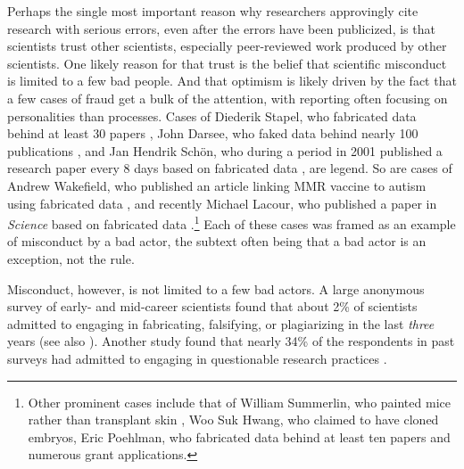 \documentclass[12pt, letterpaper]{article}
\begin{document}
Perhaps the single most important reason why researchers approvingly cite research with serious errors, even after the errors have been publicized, is that scientists trust other scientists, especially peer-reviewed work produced by other scientists. One likely reason for that trust is the belief that scientific misconduct is limited to a few bad people. And that optimism is likely driven by the fact that a few cases of fraud get a bulk of the attention, with reporting often focusing on personalities than processes. Cases of Diederik Stapel, who fabricated data behind at least 30 papers \citep{levelt2012flawed}, John Darsee, who faked data behind nearly 100 publications \citep{stewart1987integrity, anderson2013research, wallis1983fraud}, and Jan Hendrik Sch{\"o}n, who during a period in 2001 published a research paper every 8 days based on fabricated data \citep{service2003scientific, anderson2013research}, are legend. So are cases of Andrew Wakefield, who published an article linking MMR vaccine to autism using fabricated data \citep{wakefield1998retracted, deer2011case, godlee2011wakefield}, and recently Michael Lacour, who published a paper in \textit{Science} based on fabricated data \citep{broockman2015irregularities, mcnutt2015editorial}.\footnote{Other prominent cases include that of William Summerlin, who painted mice rather than transplant skin \citep{basu2006they, anderson2013research}, Woo Suk Hwang, who claimed to have cloned embryos, Eric Poehlman, who fabricated data behind at least ten papers and numerous grant applications.} Each of these cases was framed as an example of misconduct by a bad actor, the subtext often being that a bad actor is an exception, not the rule. 

Misconduct, however, is not limited to a few bad actors.  A large anonymous survey of early- and mid-career scientists found that about 2\% of scientists admitted to engaging in fabricating, falsifying, or plagiarizing in the last \textit{three} years \citet{martinson2005scientists} (see also \citet{titus2008repairing}). Another study found that nearly 34\% of the respondents in past surveys had admitted to engaging in questionable research practices \citet{fanelli2009many}.
\end{document}
